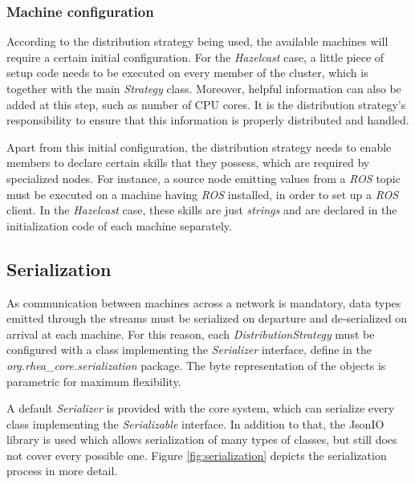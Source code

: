 \documentclass[sigplan,review,anonymous]{acmart}\settopmatter{printfolios=true}
\begin{document}

\subsubsection{Machine configuration}

According to the distribution strategy being used, the available machines will require a certain initial configuration. For the \textit{Hazelcast} case, a little piece of setup code needs to be executed on every member of the cluster, which is together with the main \textit{Strategy} class. Moreover, helpful information can also be added at this step, such as number of CPU cores. It is the distribution strategy's responsibility to ensure that this information is properly distributed and handled.

Apart from this initial configuration, the distribution strategy needs to enable members to declare certain skills that they possess, which are required by specialized nodes. For instance, a source node emitting values from a \textit{ROS} topic must be executed on a machine having \textit{ROS} installed, in order to set up a \textit{ROS} client. In the \textit{Hazelcast} case, these skills are just \textit{strings} and are declared in the initialization code of each machine separately.

\subsection{Serialization}

As communication between machines across a network is mandatory, data types emitted through the streams must be serialized on departure and de-serialized on arrival at each machine. For this reason, each \textit{DistributionStrategy} must be configured with a class implementing the \textit{Serializer} interface, define in the \textit{org.rhea\_core.serialization} package. The byte representation of the objects is parametric for maximum flexibility. 

A default \textit{Serializer} is provided with the core system, which can serialize every class implementing the \textit{Serializable} interface. In addition to that, the JsonIO library is used which allows serialization of many types of classes, but still does not cover every possible one. Figure \ref{fig:serialization} depicts the serialization process in more detail.

\end{document}
